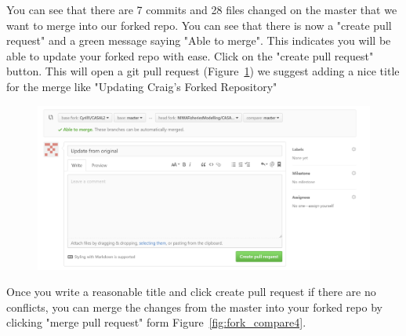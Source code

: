 You can see that there are 7 commits and 28 files changed on the master that we want to merge into our forked repo. You can see that there is now a "create pull request" and a green message saying "Able to merge". This indicates you will be able to update your forked repo with ease. Click on the "create pull request" button. This will open a git pull request (Figure~\ref{fig:fork_compare3}) we suggest adding a nice title for the merge like "Updating Craig's Forked Repository" 
\clearpage
\begin{figure}[!ht]
	\centering
	\includegraphics[scale=0.6]{Figures/Compare_fork5.png}
	\caption{}\label{fig:fork_compare3}
\end{figure}

Once you write a reasonable title and click create pull request if there are no conflicts, you can merge the changes from the master into your forked repo by clicking "merge pull request" form Figure~\ref{fig:fork_compare4}.


